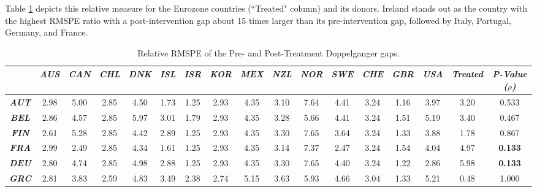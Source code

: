 \documentclass[12pt]{article}
\newcommand{\annote}[1]{\parbox{\textwidth}{\renewcommand{\baselinestretch}{1.0}\vspace{12pt} \small Notes: #1}}
\begin{document}
Table \ref{TA_RMSPE} depicts this relative measure for the Eurozone countries (``Treated" column) and its donors. Ireland stands out as the country with the highest RMSPE ratio with a post-intervention gap about 15 times larger than its pre-intervention gap, followed by Italy, Portugal, Germany, and France. 


\begin{table}[htbp]
\scriptsize
\caption{\label{TA_RMSPE} Relative RMSPE of the Pre- and Post-Treatment Doppelganger gaps.}\centering\medskip
\begin{tabular}{c|cccccccccccccc|c||c} \toprule
                      & \textit{\textbf{AUS}} & \textit{\textbf{CAN}} & \textit{\textbf{CHL}} & \textit{\textbf{DNK}} & \textit{\textbf{ISL}} & \textit{\textbf{ISR}}  & \textit{\textbf{KOR}} & \textit{\textbf{MEX}} & \textit{\textbf{NZL}} & \textit{\textbf{NOR}} & \textit{\textbf{SWE}} & \textit{\textbf{CHE}} & \textit{\textbf{GBR}} & \textit{\textbf{USA}} & \textit{\textbf{Treated}} & \textit{\textbf{P-Value ($\rho$)}} \\ \midrule
\textit{\textbf{AUT}} & 2.98 & 5.00 & 2.85 & 4.50 & 1.73 & 1.25 & 2.93 & 4.35 & 3.10 & 7.64 & 4.41 & 3.24 & 1.16 & 3.97 & 3.20  & 0.533  \\
\textit{\textbf{BEL}} & 2.86 & 4.57 & 2.85 & 5.97 & 3.01 & 1.79 & 2.93 & 4.35 & 3.28 & 5.66 & 4.41 & 3.24 & 1.51 & 5.19 & 3.40  & 0.467 \\
\textit{\textbf{FIN}} & 2.61 & 5.28 & 2.85 & 4.42 & 2.89 & 1.25 & 2.93 & 4.35 & 3.30 & 7.65 & 3.64 & 3.24 & 1.33 & 3.88 & 1.78  & 0.867 \\
\textit{\textbf{FRA}} & 2.99 & 2.49 & 2.85 & 4.34 & 1.61 & 1.25 & 2.93 & 4.35 & 3.14 & 7.37 & 2.47 & 3.24 & 1.54 & 4.04 & 4.97  & \textbf{0.133} \\
\textit{\textbf{DEU}} & 2.80 & 4.74 & 2.85 & 4.98 & 2.88 & 1.25 & 2.93 & 4.35 & 3.30 & 7.65 & 4.40 & 3.24 & 1.22 & 2.86 & 5.98  & \textbf{0.133} \\
\textit{\textbf{GRC}} & 2.81 & 3.83 & 2.59 & 4.83 & 3.49 & 2.38 & 2.74 & 5.15 & 3.63 & 5.93 & 4.66 & 3.04 & 1.33 & 5.21 & 0.48  & 1.000\\

\end{tabular}
\end{table}
\end{document}
